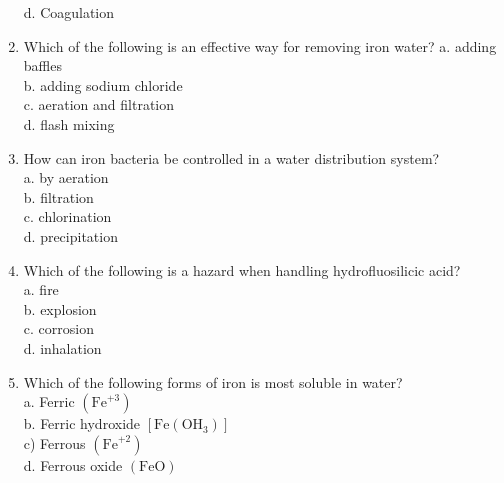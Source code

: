 \begin{enumerate}
d. Coagulation\\
\item Which of the following is an effective way for removing iron water? a. adding baffles\\
b. adding sodium chloride\\
c. aeration and filtration\\
d. flash mixing\\
\item How can iron bacteria be controlled in a water distribution system?\\
a. by aeration\\
b. filtration\\
c. chlorination\\
d. precipitation\\
\item Which of the following is a hazard when handling hydrofluosilicic acid?\\
a. fire\\
b. explosion\\
c. corrosion\\
d. inhalation\\
\item Which of the following forms of iron is most soluble in water?\\
a. Ferric $\left(\mathrm{Fe}^{+3}\right)$\\
b. Ferric hydroxide $\left[\mathrm{Fe}\left(\mathrm{OH}_{3}\right)\right]$\\
c) Ferrous $\left(\mathrm{Fe}^{+2}\right)$\\
d. Ferrous oxide $(\mathrm{FeO})$\\


\end{enumerate}
